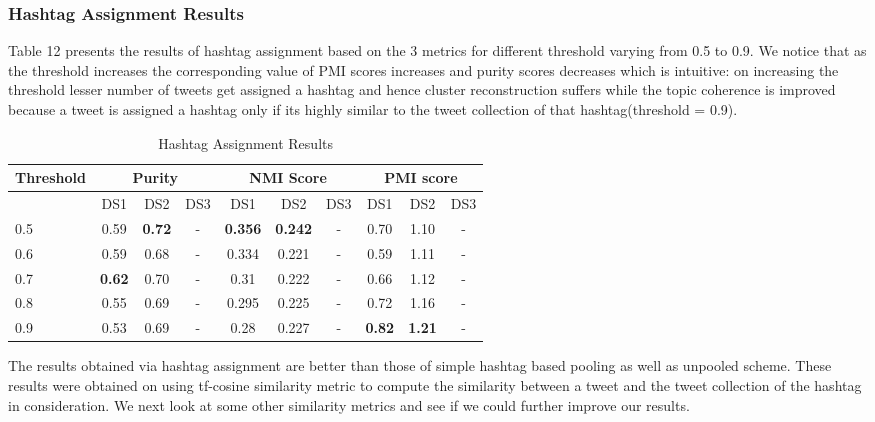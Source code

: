 \documentclass[10pt,a5paper,twoside]{article}
\begin{document}

\subsubsection{Hashtag Assignment Results}
Table 12 presents the results of hashtag assignment based on the 3 metrics for different threshold varying from 0.5 to 0.9. We notice that as the threshold increases the corresponding value of PMI scores increases and purity scores decreases which is intuitive: on increasing the threshold lesser number of tweets get assigned a hashtag and hence cluster reconstruction suffers while the topic coherence is improved because a tweet is assigned a hashtag only if its highly similar to the tweet collection of that hashtag(threshold = 0.9). 
\\

\begin{table}[!h]
\setcounter{table}{11}
\centering
	\begin{tabular}{|l|ccc|ccc|ccc|}
	\hline
	Threshold  & \multicolumn {3}{c}{Purity} & \multicolumn {3}{c}{NMI Score} & \multicolumn {3}{c}{PMI score}\\
	\hline
	 & DS1 & DS2 & DS3 &  DS1 & DS2 & DS3 &  DS1 & DS2 & DS3\\
	\hline
	0.5 & 0.59 & \textbf{0.72} & - & \textbf{0.356} & \textbf{0.242} & - & 0.70 & 1.10 & - \\
	\hline
	0.6 & 0.59 & 0.68 & - & 0.334 & 0.221 & - & 0.59 & 1.11 & - \\
	\hline
	0.7 & \textbf{0.62} & 0.70 & - & 0.31 & 0.222 & - & 0.66 & 1.12 & - \\
	\hline
	0.8 & 0.55 & 0.69 & - & 0.295 & 0.225 & - & 0.72 & 1.16 & - \\
	\hline
	0.9 & 0.53 & 0.69 & - & 0.28 & 0.227 & - & \textbf{0.82} & \textbf{1.21} & - \\
	\hline
	\end{tabular}
\caption{Hashtag Assignment Results}\label{Table}
\end{table}

The results obtained via hashtag assignment are better than those of simple hashtag based pooling as well as unpooled scheme. These results were obtained on using tf-cosine similarity metric to compute the similarity between a tweet and the tweet collection of the hashtag in consideration. We next look at some other similarity metrics and see if we could further improve our results.
\end{document}
